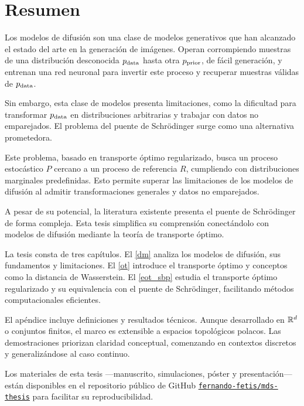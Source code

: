 \chapter*{Resumen}

Los modelos de difusión son una clase de modelos generativos que han alcanzado el estado del arte en la generación de imágenes. Operan corrompiendo muestras de una distribución desconocida $p_{\operatorname{data}}$ hasta otra $p_{\operatorname{prior}}$, de fácil generación, y entrenan una red neuronal para invertir este proceso y recuperar muestras válidas de $p_{\operatorname{data}}$.

Sin embargo, esta clase de modelos presenta limitaciones, como la dificultad para transformar $p_{\operatorname{data}}$ en distribuciones arbitrarias y trabajar con datos no emparejados. El problema del puente de Schrödinger surge como una alternativa prometedora.

Este problema, basado en transporte óptimo regularizado, busca un proceso estocástico $P$ cercano a un proceso de referencia $R$, cumpliendo con distribuciones marginales predefinidas. Esto permite superar las limitaciones de los modelos de difusión al admitir transformaciones generales y datos no emparejados.

A pesar de su potencial, la literatura existente presenta el puente de Schrödinger de forma compleja. Esta tesis simplifica su comprensión conectándolo con modelos de difusión mediante la teoría de transporte óptimo.

La tesis consta de tres capítulos. El \autoref{dm} analiza los modelos de difusión, sus fundamentos y limitaciones. El \autoref{ot} introduce el transporte óptimo y conceptos como la distancia de Wasserstein. El \autoref{eot_sbp} estudia el transporte óptimo regularizado y su equivalencia con el puente de Schrödinger, facilitando métodos computacionales eficientes.

El apéndice incluye definiciones y resultados técnicos. Aunque desarrollado en $\mathbb{R}^d$ o conjuntos finitos, el marco es extensible a espacios topológicos polacos. Las demostraciones priorizan claridad conceptual, comenzando en contextos discretos y generalizándose al caso continuo.

Los materiales de esta tesis —manuscrito, simulaciones, póster y presentación— están disponibles en el repositorio público de GitHub \href{https://github.com/fernando-fetis/mds-thesis}{\texttt{fernando-fetis/mds-thesis}} para facilitar su reproducibilidad.